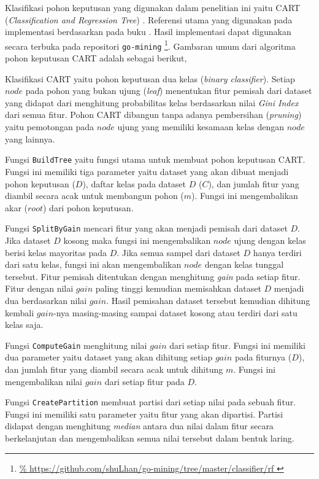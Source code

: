 Klasifikasi pohon keputusan yang digunakan dalam penelitian ini yaitu CART
(\textit{Classification and Regression Tree})
\parencite{breiman1984classification}.
Referensi utama yang digunakan pada implementasi berdasarkan pada buku
\textcite{han2011data}.
Hasil implementasi dapat digunakan secara terbuka pada repositori
\texttt{go-mining}%
\footnote{%
	\url{%
	https://github.com/shuLhan/go-mining/tree/master/classifier/rf
}}.
Gambaran umum dari algoritma pohon keputusan CART adalah sebagai berikut,

	

Klasifikasi CART yaitu pohon keputusan dua kelas (\textit{binary classifier}).
Setiap $node$ pada pohon yang bukan ujung (\textit{leaf}) menentukan fitur
pemisah dari dataset yang didapat dari menghitung probabilitas kelas
berdasarkan nilai \textit{Gini Index} dari semua fitur.
Pohon CART dibangun tanpa adanya pembersihan (\textit{pruning}) yaitu
pemotongan pada $node$ ujung yang memiliki kesamaan kelas dengan $node$ yang
lainnya.

Fungsi \texttt{BuildTree} yaitu fungsi utama untuk membuat pohon keputusan CART.
Fungsi ini memiliki tiga parameter yaitu dataset yang akan dibuat
menjadi pohon keputusan ($D$), daftar kelas pada dataset $D$ ($C$), dan jumlah
fitur yang diambil secara acak untuk membangun pohon ($m$).
Fungsi ini mengembalikan akar ($root$) dari pohon keputusan.

Fungsi \texttt{SplitByGain} mencari fitur yang akan menjadi pemisah dari dataset
$D$.
Jika dataset $D$ kosong maka fungsi ini mengembalikan $node$ ujung dengan kelas
berisi kelas mayoritas pada $D$.
Jika semua sampel dari dataset $D$ hanya terdiri dari satu kelas, fungsi ini
akan mengembalikan $node$ dengan kelas tunggal tersebut.
Fitur pemisah ditentukan dengan menghitung \textit{gain} pada setiap fitur.
Fitur dengan nilai $gain$ paling tinggi kemudian memisahkan dataset $D$ menjadi
dua berdasarkan nilai $gain$.
Hasil pemisahan dataset tersebut kemudian dihitung kembali $gain$-nya
masing-masing sampai dataset kosong atau terdiri dari satu kelas saja.

Fungsi \texttt{ComputeGain} menghitung nilai $gain$ dari setiap fitur.
Fungsi ini memiliki dua parameter yaitu dataset yang akan dihitung setiap
$gain$ pada fiturnya ($D$), dan jumlah fitur yang diambil secara acak untuk
dihitung $m$.
Fungsi ini mengembalikan nilai $gain$ dari setiap fitur pada $D$.

Fungsi \texttt{CreatePartition} membuat partisi dari setiap nilai pada sebuah
fitur.
Fungsi ini memiliki satu parameter yaitu fitur yang akan dipartisi.
Partisi didapat dengan menghitung \textit{median} antara dua nilai dalam fitur
secara berkelanjutan dan mengembalikan semua nilai tersebut dalam bentuk
laring.

